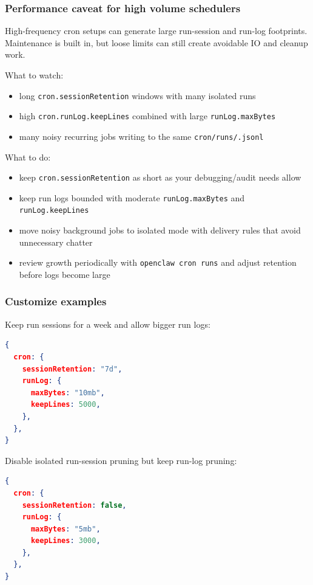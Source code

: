\subsubsection{Performance caveat for high volume schedulers}


High-frequency cron setups can generate large run-session and run-log footprints. Maintenance is built in, but loose limits can still create avoidable IO and cleanup work.

What to watch:

\begin{itemize}
  \item long \texttt{cron.sessionRetention} windows with many isolated runs
  \item high \texttt{cron.runLog.keepLines} combined with large \texttt{runLog.maxBytes}
  \item many noisy recurring jobs writing to the same \texttt{cron/runs/.jsonl}
\end{itemize}


What to do:

\begin{itemize}
  \item keep \texttt{cron.sessionRetention} as short as your debugging/audit needs allow
  \item keep run logs bounded with moderate \texttt{runLog.maxBytes} and \texttt{runLog.keepLines}
  \item move noisy background jobs to isolated mode with delivery rules that avoid unnecessary chatter
  \item review growth periodically with \texttt{openclaw cron runs} and adjust retention before logs become large
\end{itemize}


\subsubsection{Customize examples}


Keep run sessions for a week and allow bigger run logs:

\begin{lstlisting}[language=json]
{
  cron: {
    sessionRetention: "7d",
    runLog: {
      maxBytes: "10mb",
      keepLines: 5000,
    },
  },
}
\end{lstlisting}


Disable isolated run-session pruning but keep run-log pruning:

\begin{lstlisting}[language=json]
{
  cron: {
    sessionRetention: false,
    runLog: {
      maxBytes: "5mb",
      keepLines: 3000,
    },
  },
}
\end{lstlisting}


